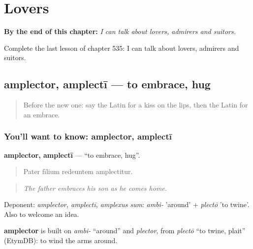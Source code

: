 
\chapter{Lovers}
\label{ch:la-lovers}

\begin{chapteropening}
\textbf{By the end of this chapter:} \emph{I can talk about lovers, admirers and suitors.}

Complete the last lesson of chapter 535: I can talk about lovers, admirers and suitors.
\end{chapteropening}

\section[amplector, amplectī]{amplector, amplectī — to embrace, hug}

\label{lesson:LA-C535-amplector}



\begin{quote}
Before the new one: say the Latin for a kiss on the lips, then the Latin for an embrace.
\end{quote}

\subsection*{You'll want to know: amplector, amplectī}
\textbf{amplector, amplectī} — \textquotedblleft{}to embrace, hug\textquotedblright{}.

\begin{quote}
Pater fīlium redeuntem amplectitur.
\end{quote}

\begin{quote}
\emph{The father embraces his son as he comes home.}
\end{quote}

Deponent: \emph{amplector, amplectī, amplexus sum}: \emph{ambi-} 'around' + \emph{plectō} 'to twine'. Also to welcome an idea.

\begin{cousinweb}
\textbf{amplector} is built on \emph{ambi-} \textquotedblleft{}around\textquotedblright{} and \emph{plector}, from \emph{plectō} \textquotedblleft{}to twine, plait\textquotedblright{} (EtymDB): to wind the arms around.
\end{cousinweb}

